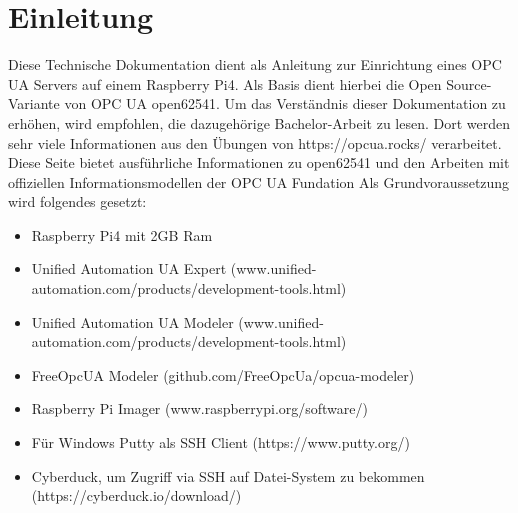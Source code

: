 \section{Einleitung} \label{sec:einleitung}
Diese Technische Dokumentation dient als Anleitung zur Einrichtung eines OPC UA Servers auf einem Raspberry Pi4. Als Basis dient hierbei die Open Source-Variante von OPC UA open62541. Um das Verständnis dieser Dokumentation zu erhöhen, wird empfohlen, die dazugehörige Bachelor-Arbeit zu lesen. Dort werden sehr viele Informationen aus den Übungen von https://opcua.rocks/ verarbeitet. Diese Seite bietet ausführliche Informationen zu open62541 und den Arbeiten mit offiziellen Informationsmodellen der OPC UA Fundation
Als Grundvoraussetzung wird folgendes gesetzt:
\begin{itemize}
	\item Raspberry Pi4 mit 2GB Ram
	\item Unified Automation UA Expert 
	(www.unified-automation.com/products/development-tools.html)
	\item Unified Automation UA Modeler 
	(www.unified-automation.com/products/development-tools.html)
	\item FreeOpcUA Modeler (github.com/FreeOpcUa/opcua-modeler)
	\item Raspberry Pi Imager (www.raspberrypi.org/software/)
	\item Für Windows Putty als SSH Client
	(https://www.putty.org/)
	\item Cyberduck, um Zugriff via SSH auf Datei-System zu bekommen
	(https://cyberduck.io/download/) 
\end{itemize}

